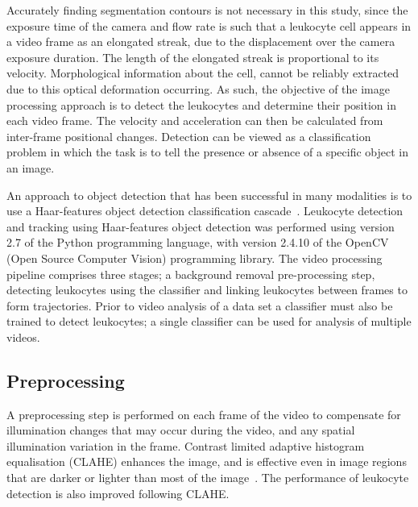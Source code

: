 Accurately finding segmentation contours is not necessary in this study, since the exposure time of the camera and flow rate is such that a leukocyte cell appears in a video frame as an elongated streak, due to the displacement over the camera exposure duration. The length of the elongated streak is proportional to its velocity. Morphological information about the cell, cannot be reliably extracted due to this optical deformation occurring. As such, the objective of the image processing approach is to detect the leukocytes and determine their position in each video frame. The velocity and acceleration can then be calculated from inter-frame positional changes. Detection can be viewed as a classification problem in which the task is to tell the presence or absence of a specific object in an image.

An approach to object detection that has been successful in many modalities is to use a Haar-features object detection classification cascade~\cite{Lienhart2002}. Leukocyte detection and tracking using Haar-features object detection was performed using version 2.7 of the Python programming language, with version 2.4.10 of the OpenCV (Open Source Computer Vision) programming library. The video processing pipeline comprises three stages; a background removal pre-processing step, detecting leukocytes using the classifier and linking leukocytes between frames to form trajectories. Prior to video analysis of a data set a classifier must also be trained to detect leukocytes; a single classifier can be used for analysis of multiple videos.

\subsection{Preprocessing}
\label{leukocytes:analysis:preprocessing}
A preprocessing step is performed on each frame of the video to compensate for illumination changes that may occur during the video, and any spatial illumination variation in the frame. Contrast limited adaptive histogram equalisation (CLAHE) enhances the image, and is effective even in image regions that are darker or lighter than most of the image~\cite{Ketcham1974}. The performance of leukocyte detection is also improved following CLAHE.

